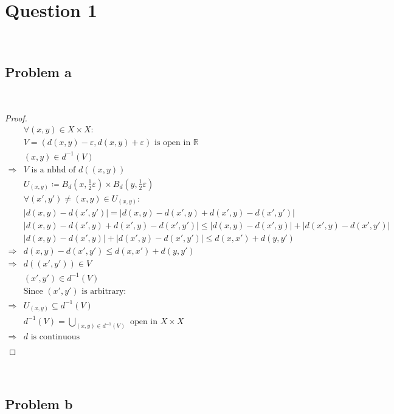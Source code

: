 \documentclass{article}
\begin{document}
\section*{Question 1}

~

\subsection*{Problem a}

~

\begin{proof}
    \begin{align*}
        &\forall (x,y)\in X\times X:\\
        &V=(d(x,y)-\varepsilon,d(x,y)+\varepsilon)\text{ is open in }\mathbb{R}\\
        &(x,y)\in d^{-1}(V)\\
        \Rightarrow&V\text{ is a nbhd of }d((x,y))\\
        &U_{(x,y)}\coloneqq B_d(x,\frac{1}{2}\varepsilon)\times B_d(y,\frac{1}{2}\varepsilon)\\
        &\forall (x',y')\ne(x,y)\in U_{(x,y)}:\\
        &|d(x,y)-d(x',y')|=|d(x,y)-d(x',y)+d(x',y)-d(x',y')|\\
        &|d(x,y)-d(x',y)+d(x',y)-d(x',y')|\leqslant |d(x,y)-d(x',y)|+|d(x',y)-d(x',y')|\\
        &|d(x,y)-d(x',y)|+|d(x',y)-d(x',y')|\leqslant d(x,x')+d(y,y')\\
        \Rightarrow&d(x,y)-d(x',y')\leqslant d(x,x')+d(y,y')\\
        \Rightarrow&d((x',y'))\in V\\
        &(x',y')\in d^{-1}(V)\\
        &\text{Since }(x',y')\text{ is arbitrary}:\\
        \Rightarrow&U_{(x,y)}\subseteq d^{-1}(V)\\
        &d^{-1}(V)=\bigcup_{(x,y)\in d^{-1}(V)}\text{ open in }X\times X\\
        \Rightarrow&d\text{ is continuous}\\
    \end{align*}
\end{proof}

~

\subsection*{Problem b}
\end{document}
